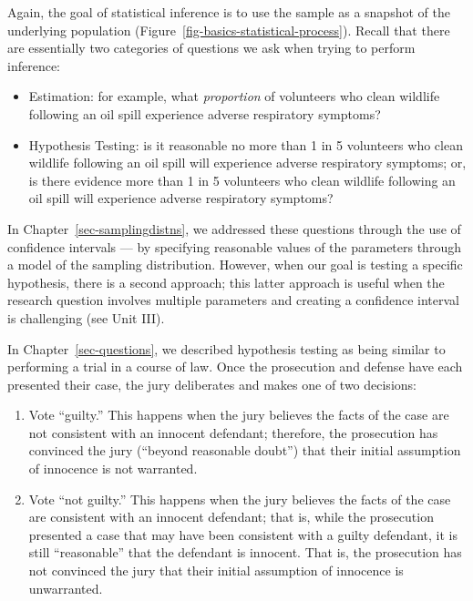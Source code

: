 \documentclass[
  letterpaper,
  DIV=11,
  numbers=noendperiod]{scrreprt}
\providecommand{\tightlist}{%
  \setlength{\itemsep}{0pt}\setlength{\parskip}{0pt}}\usepackage{longtable,booktabs,array}
\theoremstyle{plain}
\theoremstyle{definition}
\theoremstyle{definition}
\theoremstyle{remark}
\begin{document}
Again, the goal of statistical inference is to use the sample as a
snapshot of the underlying population
(Figure~\ref{fig-basics-statistical-process}). Recall that there are
essentially two categories of questions we ask when trying to perform
inference:

\begin{itemize}
\tightlist
\item
  Estimation: for example, what \emph{proportion} of volunteers who
  clean wildlife following an oil spill experience adverse respiratory
  symptoms?
\item
  Hypothesis Testing: is it reasonable no more than 1 in 5 volunteers
  who clean wildlife following an oil spill will experience adverse
  respiratory symptoms; or, is there evidence more than 1 in 5
  volunteers who clean wildlife following an oil spill will experience
  adverse respiratory symptoms?
\end{itemize}

In Chapter~\ref{sec-samplingdistns}, we addressed these questions
through the use of confidence intervals --- by specifying reasonable
values of the parameters through a model of the sampling distribution.
However, when our goal is testing a specific hypothesis, there is a
second approach; this latter approach is useful when the research
question involves multiple parameters and creating a confidence interval
is challenging (see Unit III).

In Chapter~\ref{sec-questions}, we described hypothesis testing as being
similar to performing a trial in a course of law. Once the prosecution
and defense have each presented their case, the jury deliberates and
makes one of two decisions:

\begin{enumerate}
\def\labelenumi{\arabic{enumi}.}
\tightlist
\item
  Vote ``guilty.'' This happens when the jury believes the facts of the
  case are not consistent with an innocent defendant; therefore, the
  prosecution has convinced the jury (``beyond reasonable doubt'') that
  their initial assumption of innocence is not warranted.
\item
  Vote ``not guilty.'' This happens when the jury believes the facts of
  the case are consistent with an innocent defendant; that is, while the
  prosecution presented a case that may have been consistent with a
  guilty defendant, it is still ``reasonable'' that the defendant is
  innocent. That is, the prosecution has not convinced the jury that
  their initial assumption of innocence is unwarranted.
\end{enumerate}
\end{document}
